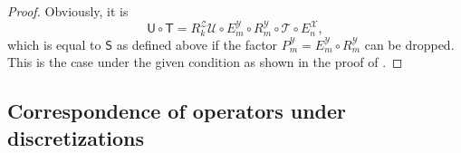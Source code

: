 \documentclass[a4paper]{paper}
\newcommand{\Spc}[1]{\mathscr{#1}}
\newcommand{\Op}[1]{\mathcal{#1}}
\newcommand{\DiscOp}[1]{\mathsf{#1}}
\newcommand*{\EXT}[2]{\ensuremath{E_{#1}^{#2}}}
\newcommand*{\REST}[2]{\ensuremath{R_{#1}^{#2}}}
\newcommand*{\PROJ}[2]{\ensuremath{P_{#1}^{#2}}}
\newcommand*{\RmY}{\ensuremath{\REST{m}{\Spc{Y}}}}
\newcommand*{\EnX}{\ensuremath{\EXT{n}{\Spc{X}}}}
\newcommand*{\EmY}{\ensuremath{\EXT{m}{\Spc{Y}}}}
\newcommand*{\PmY}{\ensuremath{\PROJ{m}{\Spc{Y}}}}
\begin{document}
\begin{proof}
 Obviously, it is
 \begin{equation*}
  \DiscOp{U} \circ \DiscOp{T} = \REST{k}{\Spc{Z}} \Op{U} \circ \EmY \circ \RmY \circ \Op{T} \circ \EnX,
 \end{equation*}
 which is equal to $\DiscOp{S}$ as defined above if the factor $\PmY = \EmY \circ \RmY$ can be dropped. This is the 
 case under the given condition as shown in the proof of .
\end{proof}


\subsection{Correspondence of operators under discretizations}
\end{document}

